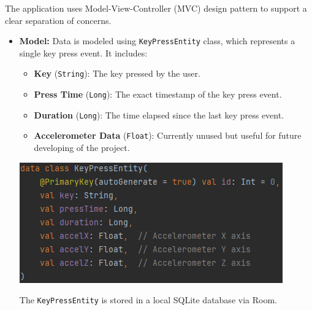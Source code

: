 The application uses Model-View-Controller (MVC) design pattern to support a clear separation of concerns. 
\begin{itemize}
	\item \textbf{Model:} Data is modeled using \texttt{KeyPressEntity} class, which represents a single key press event. It includes: 
	\begin{itemize}
		\item \textbf{Key} (\texttt{String}): The key pressed by the user.
		\item \textbf{Press Time} (\texttt{Long}): The exact timestamp of the key press event.
		\item \textbf{Duration} (\texttt{Long}): The time elapsed since the last key press event.
		\item \textbf{Accelerometer Data} (\texttt{Float}): Currently unused but useful for future developing of the project. 
	\end{itemize}
	\includegraphics[width=0.7\linewidth]{images/DataModel.png}
	
	The \texttt{KeyPressEntity} is stored in a local SQLite database via Room.
	

\end{itemize}
